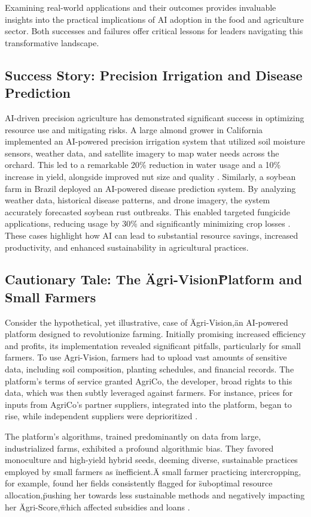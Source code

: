 Examining real-world applications and their outcomes provides invaluable insights into the practical implications of AI adoption in the food and agriculture sector. Both successes and failures offer critical lessons for leaders navigating this transformative landscape.

\subsection{Success Story: Precision Irrigation and Disease Prediction}
AI-driven precision agriculture has demonstrated significant success in optimizing resource use and mitigating risks. A large almond grower in California implemented an AI-powered precision irrigation system that utilized soil moisture sensors, weather data, and satellite imagery to map water needs across the orchard. This led to a remarkable 20\% reduction in water usage and a 10\% increase in yield, alongside improved nut size and quality \cite{Pingax_SuccessStory}. Similarly, a soybean farm in Brazil deployed an AI-powered disease prediction system. By analyzing weather data, historical disease patterns, and drone imagery, the system accurately forecasted soybean rust outbreaks. This enabled targeted fungicide applications, reducing usage by 30\% and significantly minimizing crop losses \cite{Pingax_SuccessStory}. These cases highlight how AI can lead to substantial resource savings, increased productivity, and enhanced sustainability in agricultural practices.

\subsection{Cautionary Tale: The \"Agri-Vision\" Platform and Small Farmers}
Consider the hypothetical, yet illustrative, case of \"Agri-Vision,\" an AI-powered platform designed to revolutionize farming. Initially promising increased efficiency and profits, its implementation revealed significant pitfalls, particularly for small farmers. To use Agri-Vision, farmers had to upload vast amounts of sensitive data, including soil composition, planting schedules, and financial records. The platform's terms of service granted AgriCo, the developer, broad rights to this data, which was then subtly leveraged against farmers. For instance, prices for inputs from AgriCo's partner suppliers, integrated into the platform, began to rise, while independent suppliers were deprioritized \cite{Medium_AgriVision_Failure}.

The platform's algorithms, trained predominantly on data from large, industrialized farms, exhibited a profound algorithmic bias. They favored monoculture and high-yield hybrid seeds, deeming diverse, sustainable practices employed by small farmers as \"inefficient.\" A small farmer practicing intercropping, for example, found her fields consistently flagged for \"suboptimal resource allocation,\" pushing her towards less sustainable methods and negatively impacting her \"Agri-Score,\" which affected subsidies and loans \cite{Medium_AgriVision_Failure}.

